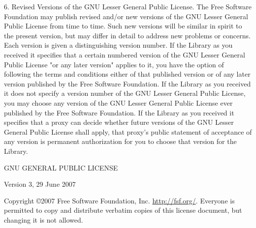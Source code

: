 \documentclass {book}
\begin{document}
\begin{tiny}
6. Revised Versions of the GNU Lesser General Public License. The Free Software Foundation may publish revised and/or new versions of the GNU Lesser General Public License from time to time. Such new versions will be similar in spirit to the present version, but may differ in detail to address new problems or concerns. Each version is given a distinguishing version number. If the Library as you received it specifies that a certain numbered version of the GNU Lesser General Public License "or any later version" applies to it, you have the option of following the terms and conditions either of that published version or of any later version published by the Free Software Foundation. If the Library as you received it does not specify a version number of the GNU Lesser General Public License, you may choose any version of the GNU Lesser General Public License ever published by the Free Software Foundation. If the Library as you received it specifies that a proxy can decide whether future versions of the GNU Lesser General Public License shall apply, that proxy's public statement of acceptance of any version is permanent authorization for you to choose that version for the Library.

\begin{center}
GNU GENERAL PUBLIC LICENSE

Version 3, 29 June 2007
\end{center}

Copyright \copyright 2007 Free Software Foundation, Inc. \url{http://fsf.org/}. Everyone is permitted to copy and distribute verbatim copies of this license document, but changing it is not allowed.


\end{tiny}
\end{document}
